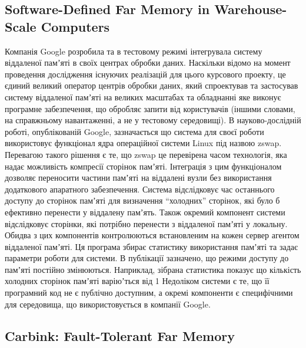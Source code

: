 \documentclass[14pt]{article}
\begin{document}
\subsection {Software-Defined Far Memory in Warehouse-Scale Computers}

    Компанія Google розробила та в тестовому режимі інтегрувала систему віддаленої памʼяті в своїх центрах обробки даних. Наскільки відомо на момент проведення дослідження існуючих реалізацій для цього курсового проекту, це єдиний великий оператор центрів обробки даних, який спроектував та застосував систему віддаленої памʼяті на великих масштабах та обладнанні яке виконує програмне забезпечення, що обробляє запити від користувачів (іншими словами, на справжньому навантаженні, а не у тестовому середовищі).
	В науково-дослідній роботі, опублікованій Google, зазначається що система для своєї роботи використовує функціонал ядра операційної системи Linux під назвою zswap. Перевагою такого рішення є те, що zswap це перевірена часом технологія, яка надає можливість компресії сторінок памʼяті. Інтеграція з цим функціоналом дозволяє переносити частини памʼяті на віддалені вузли без використання додаткового апаратного забезпечення.
Система відслідковує час останнього доступу до сторінок памʼяті для визначення “холодних” сторінок, які було б ефективно перенести у віддалену памʼять. Також окремий компонент системи відслідковує сторінки, які потрібно перенести з віддаленої памʼяті у локальну. Обидва з цих компонентів контролюються встановленим на кожен сервер агентом віддаленої памʼяті. Ця програма збирає статистику використання памʼяті та задає параметри роботи для системи.
В публікації зазначено, що режими доступу до памʼяті постійно змінюються. Наприклад, зібрана статистика показує що кількість холодних сторінок памʼяті варіюʼться від 1%
Недоліком системи є те, що її програмний код не є публічно доступним, а окремі компоненти є специфічними для середовища, що використовується в компанії Google.

\subsection{Carbink: Fault-Tolerant Far Memory}
\end{document}
